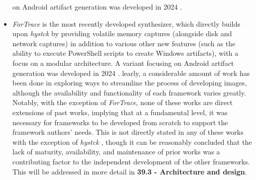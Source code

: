 \begin{itemize}
  on Android artifact generation was developed in 2024
  \cite{demmelDataSynthesisGoing2024}.
\item
  \emph{ForTrace} \cite{gobelForTraceHolisticForensic2022} is the
  most recently developed synthesizer, which directly builds upon
  \emph{hystck} by providing volatile memory captures (alongside disk
  and network captures) in addition to various other new features (such
  as the ability to execute PowerShell scripts to create Windows
  artifacts), with a focus on a modular architecture. A variant focusing
  on Android artifact generation was developed in 2024
  \cite{demmelDataSynthesisGoing2024}. learly, a considerable amount
  of work has been done in exploring ways to streamline the process of
  developing images, although the availability and functionality of each
  framework varies greatly. Notably, with the exception of
  \emph{ForTrace}, none of these works are direct extensions of past
  works, implying that at a fundamental level, it was necessary for
  frameworks to be developed from scratch to support the framework
  authors' needs. This is not directly stated in any of these works with
  the exception of \emph{hystck}
  \cite{gobelNovelApproachGenerating2020}, though it can be
  reasonably concluded that the lack of maturity, availability, and
  maintenance of prior works was a contributing factor to the
  independent development of the other frameworks. This will be
  addressed in more detail in \textbf{39.3 - Architecture and design}.
\end{itemize}
